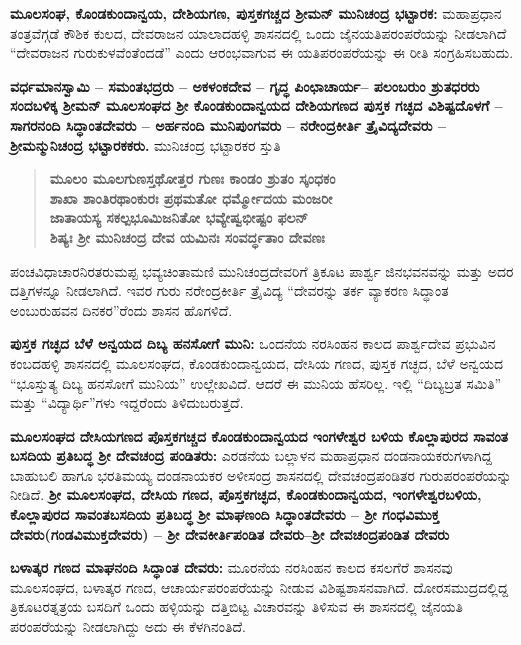 \textbf{ಮೂಲಸಂಘ, ಕೊಂಡಕುಂದಾನ್ವಯ, ದೇಶಿಯಗಣ, ಪುಸ್ತಕಗಚ್ಚದ ಶ‍್ರೀಮನ್​ ಮುನಿಚಂದ್ರ ಭಟ್ಟಾರಕ:} ಮಹಾಪ್ರಧಾನ ತಂತ್ರವೆಗ್ಗಡೆ ಕೌಶಿಕ ಕುಲದ, ದೇವರಾಜನ ಯಾಲಾದಹಳ್ಳಿ ಶಾಸನದಲ್ಲಿ ಒಂದು ಜೈನಯತಿಪರಂಪರೆಯನ್ನು ನೀಡಲಾಗಿದೆ “ದೇವರಾಜನ ಗುರುಕುಳವೆಂತೆಂದಡೆ” ಎಂದು ಆರಂಭವಾಗುವ ಈ ಯತಿಪರಂಪರೆಯನ್ನು ಈ ರೀತಿ ಸಂಗ್ರಹಿಸಬಹುದು.

\textbf{ವರ್ಧಮಾನಸ್ವಾಮಿ – ಸಮಂತಭದ್ರರು – ಅಕಳಂಕದೇವ – ಗೃದ್ಧ ಪಿಂಛಾಚಾರ್ಯ– ಪಲಂಬರುಂ ಶ್ರುತಧರರು ಸಂದಬಳಿಕ್ಕ ಶ‍್ರೀಮನ್​ ಮೂಲಸಂಘದ ಶ‍್ರೀ ಕೊಂಡಕುಂದಾನ್ವಯದ ದೇಶಿಯಗಣದ ಪುಸ್ತಕ ಗಚ್ಛದ ವಿಶಿಷ್ಟದೊಳಗೆ – ಸಾಗರನಂದಿ ಸಿದ್ಧಾಂತದೇವರು – ಅರ್ಹನಂದಿ ಮುನಿಪುಂಗವರು – ನರೇಂದ್ರಕೀರ್ತಿ ತ್ರೈವಿದ್ಯದೇವರು – ಶ‍್ರೀಮನ್ಮುನಿಚಂದ್ರ ಭಟ್ಟಾರಕಕರು.} ಮುನಿಚಂದ್ರ ಭಟ್ಟಾರಕರ ಸ್ತುತಿ

\begin{verse}
\textbf{ಮೂಲಂ ಮೂಲಗುಣಸ್ತಥೋತ್ತರ ಗುಣಃ ಕಾಂಡಂ ಶ್ರುತಂ ಸ್ಕಂಧಕಂ} \\\textbf{ಶಾಖಾ ಶಾಂತಿರಥಾಂಕುರಃ ಪ್ರಥಮತೋ ಧರ್ಮ್ಮೋದಯ ಮಂಜರೀ} \\\textbf{ಜಾತಾಯಸ್ಯ ಸಕಲ್ಪಭೂಮಿಜನಿತೋ ಭವ್ಯೇಷ್ವಭೀಷ್ಟಂ ಫಲನ್​} \\\textbf{ಶಿಷ್ಯಃ ಶ‍್ರೀ ಮುನಿಚಂದ್ರ ದೇವ ಯಮಿನಃ ಸಂವರ್ದ್ಧತಾಂ ದೇವಣಃ}
\end{verse}

ಪಂಚವಿಧಾಚಾರನಿರತರುಮಪ್ಪ ಭವ್ಯಚಿಂತಾಮಣಿ ಮುನಿಚಂದ್ರದೇವರಿಗೆ ತ್ರಿಕೂಟ ಪಾರ್ಶ್ವ ಜಿನಭವನವನ್ನು ಮತ್ತು ಅದರ ದತ್ತಿಗಳನ್ನೂ ನೀಡಲಾಗಿದೆ. ಇವರ ಗುರು ನರೇಂದ್ರಕೀರ್ತಿ ತ್ರೈವಿದ್ಯ “ದೇವರನ್ನು ತರ್ಕ ವ್ಯಾಕರಣ ಸಿದ್ಧಾಂತ ಅಂಬುರುಹವನ ದಿನಕರ”ರೆಂದು ಶಾಸನ ಹೊಗಳಿದೆ.

\textbf{ಪುಸ್ತಕ ಗಚ್ಛದ ಬೆಳೆ ಅನ್ವಯದ ದಿಬ್ಯ ಹನಸೋಗೆ ಮುನಿ:} ಒಂದನೆಯ ನರಸಿಂಹನ ಕಾಲದ ಪಾರ್ಶ್ವದೇವ ಪ್ರಭುವಿನ ಕಂಬದಹಳ್ಳಿ ಶಾಸನದಲ್ಲಿ ಮೂಲಸಂಘದ, ಕೊಂಡಕುಂದಾನ್ವಯದ, ದೇಸಿಯ ಗಣದ, ಪುಸ್ತಕ ಗಚ್ಛದ, ಬೆಳೆ ಅನ್ವಯದ “ಭೂಸ್ತುತ್ಯ ದಿಬ್ಯ ಹನಸೋಗೆ ಮುನಿಯ” ಉಲ್ಲೇಖವಿದೆ. ಆದರೆ ಈ ಮುನಿಯ ಹೆಸರಿಲ್ಲ. ಇಲ್ಲಿ “ದಿಬ್ಯಬ್ರತ ಸಮಿತಿ” ಮತ್ತು “ವಿದ್ಯಾರ್ಥಿ”ಗಳು ಇದ್ದರೆಂದು ತಿಳಿದುಬರುತ್ತದೆ.

\textbf{ಮೂಲಸಂಘದ ದೇಸಿಯಗಣದ ಪೊಸ್ತಕಗಚ್ಚದ ಕೊಂಡಕುಂದಾನ್ವಯದ ಇಂಗಳೇಶ್ವರ ಬಳಿಯ ಕೊಲ್ಲಾಪುರದ ಸಾವಂತ ಬಸದಿಯ ಪ್ರತಿಬದ್ಧ ಶ‍್ರೀ ದೇವಚಂದ್ರ ಪಂಡಿತರು: } ಎರಡನೆಯ ಬಲ್ಲಾಳನ ಮಹಾಪ್ರಧಾನ ದಂಡನಾಯಕರುಗಳಾಗಿದ್ದ ಬಾಹುಬಲಿ ಹಾಗೂ ಭರತಿಮಯ್ಯ ದಂಡನಾಯಕರ ಅಳೀಸಂದ್ರ ಶಾಸನದಲ್ಲಿ ದೇವಚಂದ್ರಪಂಡಿತರ ಗುರುಪರಂಪರೆಯನ್ನು ನೀಡಿದೆ. \textbf{ಶ‍್ರೀ ಮೂಲಸಂಘದ, ದೇಸಿಯ ಗಣದ, ಪೊಸ್ತಕಗಚ್ಛದ, ಕೊಂಡಕುಂದಾನ್ವಯದ, ಇಂಗಳೇಶ್ವರಬಳಿಯ, ಕೊಲ್ಲಾಪುರದ ಸಾವಂತಬಸದಿಯ ಪ್ರತಿಬದ್ಧ ಶ‍್ರೀ ಮಾಘಣಂದಿ ಸಿದ್ಧಾಂತದೇವರು – ಶ‍್ರೀ ಗಂಧವಿಮುಕ್ತ ದೇವರು(ಗಂಡವಿಮುಕ್ತದೇವರು) – ಶ‍್ರೀ ದೇವಕೀರ್ತಿಪಂಡಿತ ದೇವರು–ಶ‍್ರೀ ದೇವಚಂದ್ರಪಂಡಿತ ದೇವರು}

\textbf{ಬಳಾತ್ಕರ ಗಣದ ಮಾಘನಂದಿ ಸಿದ್ಧಾಂತ ದೇವರು:} ಮೂರನೆಯ ನರಸಿಂಹನ ಕಾಲದ ಕಸಲಗೆರೆ ಶಾಸನವು ಮೂಲಸಂಘದ, ಬಳಾತ್ಕರ ಗಣದ, ಆಚಾರ್ಯಪರಂಪರೆಯನ್ನು ನೀಡುವ ವಿಶಿಷ್ಟಶಾಸನವಾಗಿದೆ. ದೋರಸಮುದ್ರದಲ್ಲಿದ್ದ ತ್ರಿಕೂಟರತ್ನತ್ರಯ ಬಸದಿಗೆ ಒಂದು ಹಳ್ಳಿಯನ್ನು ದತ್ತಿಬಿಟ್ಟ ವಿಚಾರವನ್ನು ತಿಳಿಸುವ ಈ ಶಾಸನದಲ್ಲಿ ಜೈನಯತಿ ಪರಂಪರೆಯನ್ನು ನೀಡಲಾಗಿದ್ದು ಅದು ಈ ಕೆಳಗಿನಂತಿದೆ.

